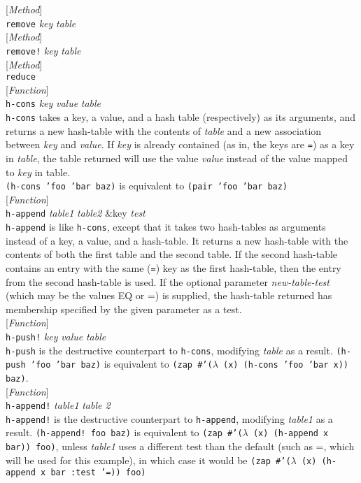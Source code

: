 \documentclass[10pt]{book}
\newenvironment{defother}[2]{[\textit{#1}]\\\texttt{#2}}{\\}
\newenvironment{defun}[1]{\begin{defother}{Function}{#1}}{\end{defother}}
\newenvironment{defmethod}[1]{\begin{defother}{Method}{#1}}{\end{defother}}
\begin{document}
\begin{defmethod}{remove} \textit{key} \textit{table}\end{defmethod}
\begin{defmethod}{remove!} \textit{key} \textit{table} \end{defmethod}
\begin{defmethod}{reduce} \end{defmethod}
\begin{defun}{h-cons} \textit{key} \textit{value} \textit{table}\\
\texttt{h-cons} takes a key, a value, and a hash table (respectively) as its arguments, and returns a new hash-table with the contents of \textit{table} and a new association between \textit{key} and \textit{value}. If \textit{key} is already contained (as in, the keys are \texttt{=}) as a key in \textit{table}, the table returned will use the value \textit{value} instead of the value mapped to \textit{key} in table.\\
\texttt{(h-cons 'foo 'bar baz)} is equivalent to \texttt{(pair 'foo 'bar baz)} \end{defun}
\begin{defun}{h-append} \textit{table1} \textit{table2} \&key \textit{test}\\
\texttt{h-append} is like \texttt{h-cons}, except that it takes two hash-tables as arguments instead of a key, a value, and a hash-table. It returns a new hash-table with the contents of both the first table and the second table. If the second hash-table contains an entry with the same (\texttt{=}) key as the first hash-table, then the entry from the second hash-table is used. If the optional parameter \textit{new-table-test} (which may be the values EQ or =) is supplied, the hash-table returned has membership specified by the given parameter as a test.\end{defun}
\begin{defun}{h-push!} \textit{key} \textit{value} \textit{table}\\
\texttt{h-push} is the destructive counterpart to \texttt{h-cons}, modifying \textit{table} as a result. \texttt{(h-push 'foo 'bar baz)} is equivalent to \texttt{(zap \#'($\lambda$ (x) (h-cons 'foo 'bar x)) baz)}.\end{defun}
\begin{defun}{h-append!} \textit{table1} \textit{table 2}\\
\texttt{h-append!} is the destructive counterpart to \texttt{h-append}, modifying \textit{table1} as a result. \texttt{(h-append! foo baz)} is equivalent to \texttt{(zap \#'($\lambda$ (x) (h-append x bar)) foo)}, unless \textit{table1} uses a different test than the default (such as =, which will be used for this example), in which case it would be \texttt{(zap \#'($\lambda$ (x) (h-append x bar :test '=)) foo)} 
\end{defun}
\end{document}
